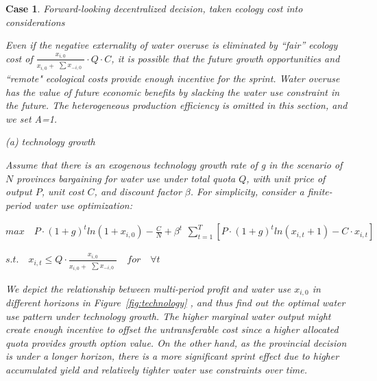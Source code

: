 \documentclass[default, sn-standardnature]{sn-jnl} %
\newtheorem{case_appendix}{Case}
\begin{document}
    \begin{case_appendix}Forward-looking decentralized decision, taken ecology cost into considerations

    Even if the negative externality of water overuse is eliminated by ``fair'' ecology cost of $\frac{x_{i,0}}{x_{i,0} + \begin{matrix} \sum x_{-i,0} \end{matrix}} \cdot Q \cdot C$, it is possible that the future growth opportunities and ``remote" ecological costs provide enough incentive for the sprint.  Water overuse has the value of future economic benefits by slacking the water use constraint in the future. The heterogeneous production efficiency is omitted in this section, and we set A=1.

(a) technology growth

Assume that there is an exogenous technology growth rate of g in the scenario of $N$ provinces bargaining for water use under total quota $Q$, with unit price of output $P$, unit cost $C$, and discount factor $\beta$. For simplicity, consider a finite-period water use optimization:

$ max \quad P \cdot (1+g)^t ln(1+x_{i,0})-\frac{C}{N}+\beta^t \begin{matrix} \sum_{t=1}^T [P \cdot (1+g)^t ln(x_{i,t}+1)-C \cdot x_{i,t}] \end{matrix}$

$s.t. \quad x_{i,t} \leq Q \cdot \frac{x_{i,0}}{x_{i,0} + \begin{matrix} \sum x_{-i,0} \end{matrix}} \quad for \quad \forall t$

We depict the relationship between multi-period profit and water use $x_{i,0}$ in different horizons in Figure~\ref{fig:technology}
, and thus find out the optimal water use pattern under technology growth. The higher marginal water output might create enough incentive to offset the untransferable cost since a higher allocated quota provides growth option value. On the other hand, as the provincial decision is under a longer horizon, there is a more significant sprint effect due to higher accumulated yield and relatively tighter water use constraints over time.


\end{case_appendix}
\end{document}
